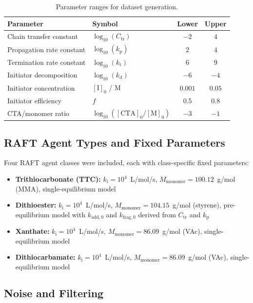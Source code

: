\documentclass[journal=mamobx,manuscript=suppinfo]{achemso}
\begin{document}
\begin{table}[htbp]
\centering
\caption{Parameter ranges for dataset generation.}
\label{tab:param_ranges}
\begin{tabular}{@{}llcc@{}}
\toprule
Parameter & Symbol & Lower & Upper \\
\midrule
Chain transfer constant & $\log_{10}(C_{\mathrm{tr}})$ & $-2$ & $4$ \\
Propagation rate constant & $\log_{10}(k_{\mathrm{p}})$ & $2$ & $4$ \\
Termination rate constant & $\log_{10}(k_{\mathrm{t}})$ & $6$ & $9$ \\
Initiator decomposition & $\log_{10}(k_{\mathrm{d}})$ & $-6$ & $-4$ \\
Initiator concentration & $[\mathrm{I}]_0$ / M & $0.001$ & $0.05$ \\
Initiator efficiency & $f$ & $0.5$ & $0.8$ \\
CTA/monomer ratio & $\log_{10}([\mathrm{CTA}]_0/[\mathrm{M}]_0)$ & $-3$ & $-1$ \\
\bottomrule
\end{tabular}
\end{table}

\subsection{RAFT Agent Types and Fixed Parameters}

Four RAFT agent classes were included, each with class-specific fixed
parameters:

\begin{itemize}
  \item \textbf{Trithiocarbonate (TTC):} $k_{\mathrm{i}} = 10^4$~L/mol/s,
    $M_{\mathrm{monomer}} = 100.12$~g/mol (MMA), single-equilibrium model
  \item \textbf{Dithioester:} $k_{\mathrm{i}} = 10^4$~L/mol/s,
    $M_{\mathrm{monomer}} = 104.15$~g/mol (styrene), pre-equilibrium model
    with $k_{\mathrm{add},0}$ and $k_{\mathrm{frag},0}$ derived from
    $C_{\mathrm{tr}}$ and $k_{\mathrm{p}}$
  \item \textbf{Xanthate:} $k_{\mathrm{i}} = 10^4$~L/mol/s,
    $M_{\mathrm{monomer}} = 86.09$~g/mol (VAc), single-equilibrium model
  \item \textbf{Dithiocarbamate:} $k_{\mathrm{i}} = 10^4$~L/mol/s,
    $M_{\mathrm{monomer}} = 86.09$~g/mol (VAc), single-equilibrium model
\end{itemize}

\subsection{Noise and Filtering}
\end{document}
